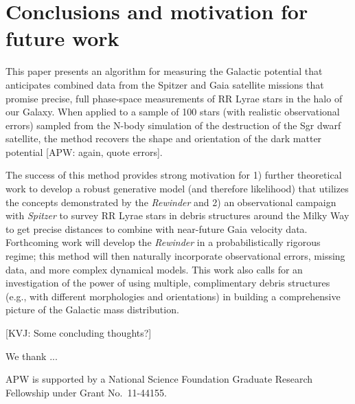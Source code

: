 \documentclass{emulateapj}
\begin{document}
\section{Conclusions and motivation for future work}
\label{sec:conclusion}

This paper presents an algorithm for measuring the Galactic potential
that anticipates combined data from the Spitzer and Gaia satellite
missions that promise precise, full phase-space measurements of RR
Lyrae stars in the halo of our Galaxy. When applied to a sample of 100
stars (with realistic observational errors) sampled from the
\cite{law10} N-body simulation of the destruction of the Sgr dwarf
satellite, the method recovers the shape and orientation of the dark
matter potential [APW: again, quote errors]. 

The success of this method provides strong motivation for 1) further theoretical work to develop a robust generative model (and therefore likelihood) that utilizes the concepts demonstrated by the \emph{Rewinder} and 2) an observational campaign with \emph{Spitzer} to survey RR Lyrae stars in debris structures around the Milky Way to get precise
distances to combine with near-future Gaia velocity data. Forthcoming work will develop the \emph{Rewinder} in a probabilistically rigorous regime; this method will then naturally incorporate observational errors, missing data, and more complex dynamical models. This work also calls for an investigation of the power of using multiple, complimentary debris structures (e.g., with different morphologies and orientations) in building a comprehensive picture of
the Galactic mass distribution.

[KVJ: Some concluding thoughts?]

\acknowledgments
We thank ...

APW is supported by a National Science Foundation Graduate Research
Fellowship under Grant No.\ 11-44155.



\end{document}
